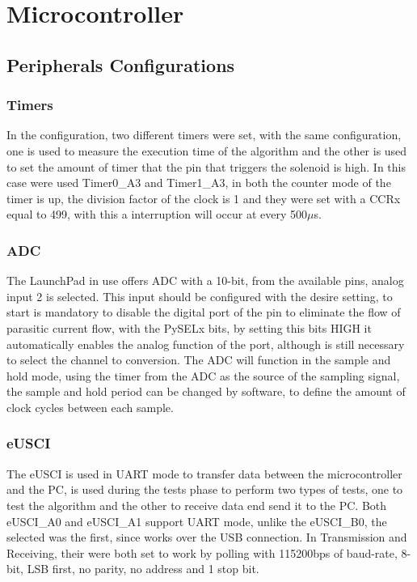 \section{Microcontroller}
%
\subsection{Peripherals Configurations}
\subsubsection*{Timers}
In the configuration, two different timers were set, with the same configuration, one is used to measure the execution time of the algorithm and the other is used to set the amount of timer that the pin that triggers the solenoid is high. In this case were used Timer0\_A3 and Timer1\_A3, in both the counter mode of the timer is up, the division factor of the clock is 1 and they were set with a CCRx equal to 499, with this a interruption will occur at every 500$\mu$s.
\subsubsection*{ADC}
The LaunchPad in use offers ADC with a 10-bit, from the available pins, analog input 2 is selected. This input should be configured with the desire setting, to start is mandatory to disable the digital port of the pin to eliminate the flow of parasitic current flow, with the PySELx bits, by setting this bits HIGH it automatically enables the analog function of the port, although is still necessary to select the channel to conversion. The ADC will function in the sample and hold mode, using the timer from the ADC as the source of the sampling signal, the sample and hold period can be changed by software, to define the amount of clock cycles between each sample. 
\subsubsection*{eUSCI}
The eUSCI is used in UART mode to transfer data between the microcontroller and the PC, is used during the tests phase to perform two types of tests, one to test the algorithm and the other to receive data end send it to the PC. Both eUSCI\_A0 and eUSCI\_A1 support UART mode, unlike the eUSCI\_B0, the selected was the first, since works over the USB connection. In Transmission and Receiving, their were both set to work by polling with 115200bps of baud-rate, 8-bit, LSB first, no parity, no address and 1 stop bit.

